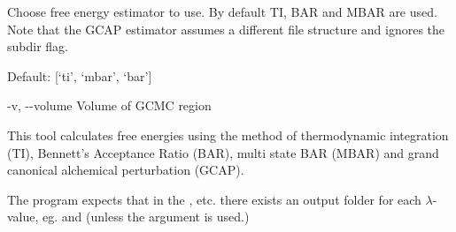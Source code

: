 \documentclass[letterpaper,10pt,english]{sphinxmanual}
\begin{document}
\begin{optionlist}{3cm}
Choose free energy estimator to use. By default TI, BAR and MBAR are used. Note that the GCAP estimator assumes a different file structure and ignores the \textendash{}subdir flag.

Default: {[}‘ti’, ‘mbar’, ‘bar’{]}
\item [-v, -{-}volume]  
Volume of GCMC region
\end{optionlist}


%
\begin{sphinxVerbatim}[commandchars=\\\{\}]
  
      
      
       
      
         
\end{sphinxVerbatim}


This tool calculates free energies using the method of thermodynamic integration (TI), Bennett’s Acceptance Ratio (BAR), multi state BAR (MBAR) and grand canonical alchemical perturbation (GCAP).

The program expects that in the ,  etc. there exists an output folder for each \(\lambda\)-value, eg.  and  (unless the  argument is used.)
\end{document}
